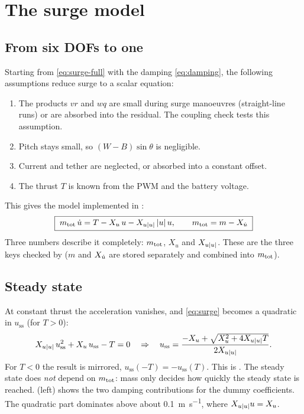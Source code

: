 \chapter{The surge model}
\label{ch:surge}

\section{From six DOFs to one}

Starting from \eqref{eq:surge-full} with the damping \eqref{eq:damping}, the following
assumptions reduce surge to a scalar equation:
\begin{enumerate}
  \item The products $vr$ and $wq$ are small during surge manoeuvres (straight-line runs)
        or are absorbed into the residual. The coupling check tests this assumption.
  \item Pitch stays small, so $(W-B)\sin\theta$ is negligible.
  \item Current and tether are neglected, or absorbed into a constant offset.
  \item The thrust $T$ is known from the PWM and the battery voltage.
\end{enumerate}
This gives the model implemented in :
\begin{equation}
  \boxed{\;m_\mathrm{tot}\,\dot u = T - X_u\,u - X_{u|u|}\,|u|\,u, \qquad m_\mathrm{tot} = m - X_{\dot u}\;}
  \label{eq:surge}
\end{equation}
Three numbers describe it completely: $m_\mathrm{tot}$, $X_u$ and $X_{u|u|}$. These are the three
 keys checked by  ($m$ and $X_{\dot u}$ are stored
separately and combined into $m_\mathrm{tot}$).

\section{Steady state}

At constant thrust the acceleration vanishes, and \eqref{eq:surge} becomes a quadratic in
$u_\mathrm{ss}$ (for $T > 0$):
\begin{equation}
  X_{u|u|}\,u_\mathrm{ss}^2 + X_u\,u_\mathrm{ss} - T = 0
  \quad\Rightarrow\quad
  u_\mathrm{ss} = \frac{-X_u + \sqrt{X_u^2 + 4X_{u|u|} T}}{2X_{u|u|}}.
  \label{eq:uss}
\end{equation}
For $T<0$ the result is mirrored, $u_\mathrm{ss}(-T) = -u_\mathrm{ss}(T)$. This is
. The steady state does \emph{not} depend on $m_\mathrm{tot}$: mass only
decides how quickly the steady state is reached.  (left) shows the two damping
contributions for the dummy coefficients. The quadratic part dominates above about
\qty{0.1}{\meter\per\second}, where $X_{u|u|} u = X_u$.

